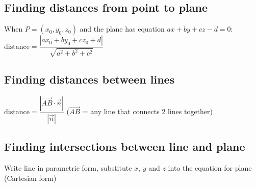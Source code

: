 \subsection{Finding distances from point to plane}
When $P=(x_0,y_0,z_0)$ and the plane has equation $ax+by+cz-d=0$:
\begin{math}\text{distance}=\dfrac{|ax_0+by_0+cz_0+d|}{\sqrt{a^2+b^2+c^2}}\end{math}
\subsection{Finding distances between lines}
$\text{distance}=\dfrac{|\overrightarrow{AB}\cdot\vec{n}|}{|\vec{n}|}$ ($\overrightarrow{AB}$ = any line that connects 2 lines together)
\subsection{Finding intersections between line and plane}
Write line in parametric form, substitute $x$, $y$ and $z$ into the equation for plane (Cartesian form)